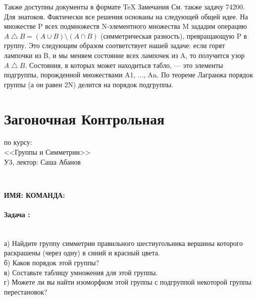 \documentclass[amsmath,amssymb,12pt]{revtex4}
\newcommand{\1}{\frac{1}{2}}
\begin{document}
Также доступны документы в формате TeX 
Замечания
См. также задачу 74200.
Для знатоков. Фактически все решения основаны на следующей общей идее. На множестве P всех подмножеств N-элементного множества M зададим операцию  $A \bigtriangleup B = (A \cup B) \setminus (A \cap B)$  (симметрическая разность), превращающую P в группу. Это следующим образом соответствует нашей задаче: если горят лампочки из B, и мы меняем состояние всех лампочек из A, то получится узор  $A \bigtriangleup B$.  Состояния, в которых может находиться табло, — это элементы подгруппы, порожденной множествами  A1, ..., An.  По теореме Лагранжа порядок группы (а он равен 2N) делится на порядок подгруппы.
\fi






\newpage
\setcounter{page}{1}
\mbox \\
\vspace{-0.5cm}
\section*{\Large Загоночная Контрольная} 
\begin{center}
{\Large по курсу: \\ \vspace{0.1cm}
<<Группы и Симметрии>> \\ \vspace{0.1cm}
У3, лектор: Саша Абанов}
\end{center}
\setcounter{prn}{0}

\mbox{} \\
\vspace{-9cm}

{\bf \Large ИМЯ:  \hspace{7cm} КОМАНДА: }
\vspace{7.0cm}


\addtocounter{prn}{1}
\vspace{0.3cm}
\paragraph*{\large Задача \theprn: }
\mbox{}
\\
а) Найдите группу симметрии правильного шестиугольника вершины которого раскрашены (через одну) в синий и красный цвета.  
\\
б) Каков порядок этой группы?
\\
в) Составьте таблицу умножения для этой группы. 
\\
г) Можете ли вы найти изоморфизм этой группы с подгруппой некоторой группы перестановок?
\end{document}
